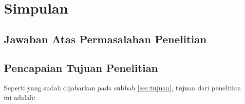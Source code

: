 \chapter{Simpulan}
\label{chap:simpulan}

\section{Jawaban Atas Permasalahan Penelitian}
\label{sec:jawaban-masalah}

\section{Pencapaian Tujuan Penelitian}
\label{sec:pencapaian-tujuan}

Seperti yang sudah dijabarkan pada subbab \ref{sec:tujuan}, tujuan dari penelitian ini adalah:

